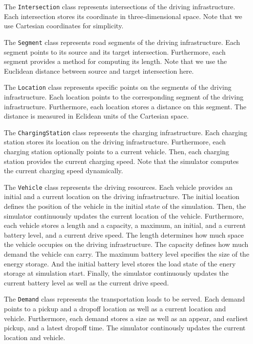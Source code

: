 \documentclass[10pt,twocolumn]{article}
\begin{document}
The \texttt{Intersection} class represents intersections of the driving infrastructure.
Each intersection stores its coordinate in three-dimensional space.
Note that we use Cartesian coordinates for simplicity.

The \texttt{Segment} class represents road segments of the driving infrastructure.
Each segment points to its source and its target intersection.
Furthermore, each segment provides a method for computing its length.
Note that we use the Euclidean distance between source and target intersection here.

The \texttt{Location} class represents specific points on the segments of the driving infrastructure.
Each location points to the corresponding segment of the driving infrastructure.
Furthermore, each location stores a distance on this segment.
The distance is measured in Eclidean units of the Cartesian space.

The \texttt{ChargingStation} class represents the charging infrastructure.
Each charging station stores its location on the driving infrastructure.
Furthermore, each charging station optionally points to a current vehicle.
Then, each charging station provides the current charging speed.
Note that the simulator computes the current charging speed dynamically.

The \texttt{Vehicle} class represents the driving resources.
Each vehicle provides an initial and a current location on the driving infrastructure.
The initial location defines the position of the vehicle in the initial state of the simulation.
Then, the simulator continuously updates the current location of the vehicle.
Furthermore, each vehicle stores a length and a capacity, a maximum, an initial, and a current battery level, and a current drive speed.
The length determines how much space the vehicle occupies on the driving infrastructure.
The capacity defines how much demand the vehicle can carry.
The maximum battery level specifies the size of the energy storage.
And the initial battery level stores the load state of the enery storage at simulation start.
Finally, the simulator continuously updates the current battery level as well as the current drive speed.

The \texttt{Demand} class represents the transportation loads to be served.
Each demand points to a pickup and a dropoff location as well as a current location and vehicle.
Furthermore, each demand stores a size as well as an appear, and earliest pickup, and a latest dropoff time.
The simulator continously updates the current location and vehicle.
\end{document}
